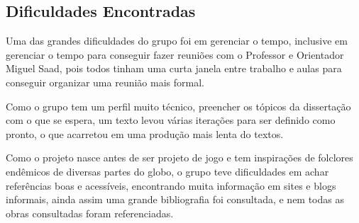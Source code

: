 \subsection{Dificuldades Encontradas}

Uma das grandes dificuldades do grupo foi em gerenciar o tempo, inclusive em gerenciar o tempo para conseguir fazer reuniões com o Professor e Orientador Miguel Saad, pois todos tinham uma curta janela entre trabalho e aulas para conseguir organizar uma reunião mais formal.

Como o grupo tem um perfil muito técnico, preencher os tópicos da dissertação com o que se espera, um texto levou várias iterações para ser definido como pronto, o que acarretou em uma produção mais lenta do textos.

Como o projeto nasce antes de ser projeto de jogo e tem inspirações de folclores endêmicos de diversas partes do globo, o grupo teve dificuldades em achar referências boas e acessíveis, encontrando muita informação em sites e blogs informais, ainda assim uma grande bibliografia foi consultada, e nem todas as obras consultadas foram referenciadas.







